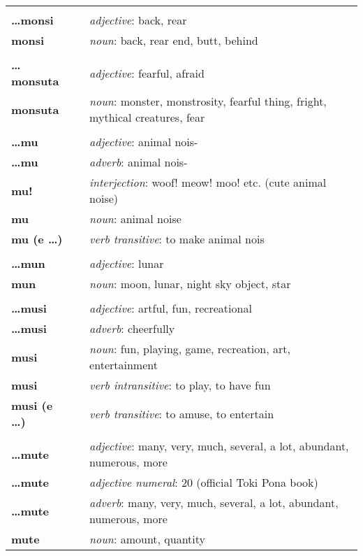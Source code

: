 \begin{supertabular}{p{2,5cm}|ll}
 && \\ %
\textbf{\dots monsi} && \textit{adjective}: back, rear \\ 
\textbf{monsi} && \textit{noun}: back, rear end, butt, behind \\ 
 && \\ %
\textbf{\dots monsuta} && \textit{adjective}: fearful, afraid \\ 
\textbf{monsuta} && \textit{noun}: monster, monstrosity, fearful thing, fright, mythical creatures, fear \\ 
 && \\ %
\textbf{\dots mu} && \textit{adjective}: animal nois- \\ 
\textbf{\dots mu} && \textit{adverb}: animal nois- \\ 
\textbf{mu!} && \textit{interjection}: woof! meow! moo! etc. (cute animal noise) \\ 
\textbf{mu} && \textit{noun}: animal noise \\ 
\textbf{mu (e \dots)} && \textit{verb transitive}: to make animal nois \\ 
 && \\ %
\textbf{\dots mun} && \textit{adjective}: lunar \\ 
\textbf{mun} && \textit{noun}: moon, lunar, night sky object, star \\ 
 && \\ %
\textbf{\dots musi} && \textit{adjective}: artful, fun, recreational \\ 
\textbf{\dots musi} && \textit{adverb}: cheerfully \\ 
\textbf{musi} && \textit{noun}: fun, playing, game, recreation, art, entertainment \\ 
\textbf{musi} && \textit{verb intransitive}: to play, to have fun \\ 
\textbf{musi (e \dots)} && \textit{verb transitive}: to amuse, to entertain \\ 
 && \\ %
\textbf{\dots mute} && \textit{adjective}: many, very, much, several, a lot, abundant, numerous, more \\ 
\textbf{\dots mute} && \textit{adjective numeral}: 20 (official Toki Pona book) \\ 
\textbf{\dots mute} && \textit{adverb}: many, very, much, several, a lot, abundant, numerous, more \\ 
\textbf{mute} && \textit{noun}: amount, quantity \\ 

\end{supertabular}
